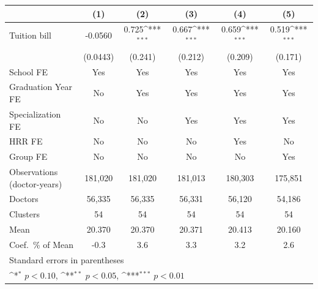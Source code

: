 {
\def\sym#1{\ifmmode^{#1}\else\(^{#1}\)\fi}
\begin{tabular}{l*{5}{c}}
\hline\hline
                    &\multicolumn{1}{c}{(1)}         &\multicolumn{1}{c}{(2)}         &\multicolumn{1}{c}{(3)}         &\multicolumn{1}{c}{(4)}         &\multicolumn{1}{c}{(5)}         \\
\hline
Tuition bill        &     -0.0560         &       0.725\sym{***}&       0.667\sym{***}&       0.659\sym{***}&       0.519\sym{***}\\
                    &    (0.0443)         &     (0.241)         &     (0.212)         &     (0.209)         &     (0.171)         \\
[1em]
School FE           &         Yes         &         Yes         &         Yes         &         Yes         &         Yes         \\
[1em]
Graduation Year FE  &          No         &         Yes         &         Yes         &         Yes         &         Yes         \\
[1em]
Specialization FE   &          No         &          No         &         Yes         &         Yes         &         Yes         \\
[1em]
HRR FE              &          No         &          No         &          No         &         Yes         &          No         \\
[1em]
Group FE            &          No         &          No         &          No         &          No         &         Yes         \\
\hline
Observations (doctor-years)&     181,020         &     181,020         &     181,013         &     180,303         &     175,851         \\
Doctors             &      56,335         &      56,335         &      56,331         &      56,120         &      54,186         \\
Clusters            &          54         &          54         &          54         &          54         &          54         \\
Mean                &      20.370         &      20.370         &      20.371         &      20.413         &      20.160         \\
Coef.\ \% of Mean   &        -0.3         &         3.6         &         3.3         &         3.2         &         2.6         \\
\hline\hline
\multicolumn{6}{l}{\footnotesize Standard errors in parentheses}\\
\multicolumn{6}{l}{\footnotesize \sym{*} \(p<0.10\), \sym{**} \(p<0.05\), \sym{***} \(p<0.01\)}\\
\end{tabular}
}
